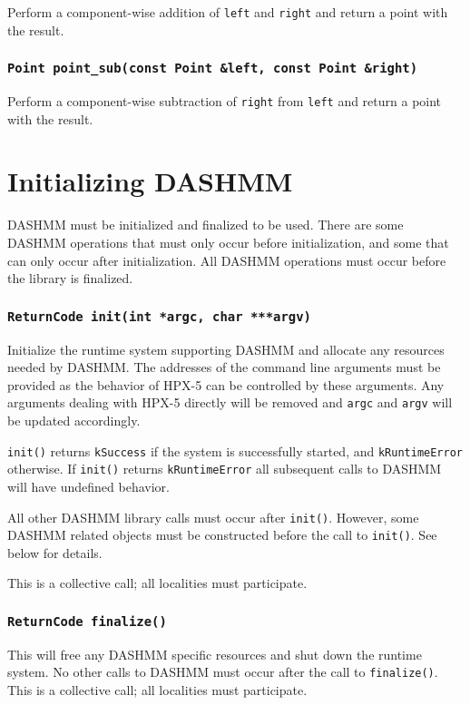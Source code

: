 Perform a  component-wise addition of \texttt{left} and \texttt{right} and
return a point with the result.

\subsubsection{\texttt{Point point\_sub(const Point \&left, const Point \&right)}}

Perform a component-wise subtraction of \texttt{right} from \texttt{left} and return
a point with the result.


\section{Initializing DASHMM}

DASHMM must be initialized and finalized to be used. There are some DASHMM
operations that must only occur before initialization, and some that can only
occur after initialization. All DASHMM operations must occur before the
library is finalized.

\subsubsection{\texttt{ReturnCode init(int *argc, char ***argv)}}

Initialize the runtime system supporting DASHMM and allocate any resources
needed by DASHMM. The addresses of the command line arguments must be
provided as the behavior of HPX-5 can be controlled by these arguments. Any
arguments dealing with HPX-5 directly will be removed and \texttt{argc} and
\texttt{argv} will be updated accordingly.

\texttt{init()} returns \texttt{kSuccess} if the system is successfully
started, and \texttt{kRuntimeError} otherwise. If \texttt{init()} returns
\texttt{kRuntimeError} all subsequent calls to DASHMM will have undefined
behavior.

All other DASHMM library calls must occur after \texttt{init()}. However, some
DASHMM related objects must be constructed before the call to \texttt{init()}.
See below for details.

This is a collective call; all localities must participate.

\subsubsection{\texttt{ReturnCode finalize()}}

This will free any DASHMM specific resources and shut down the runtime system.
No other calls to DASHMM must occur after the call to \texttt{finalize()}.
This is a collective call; all localities must participate.



